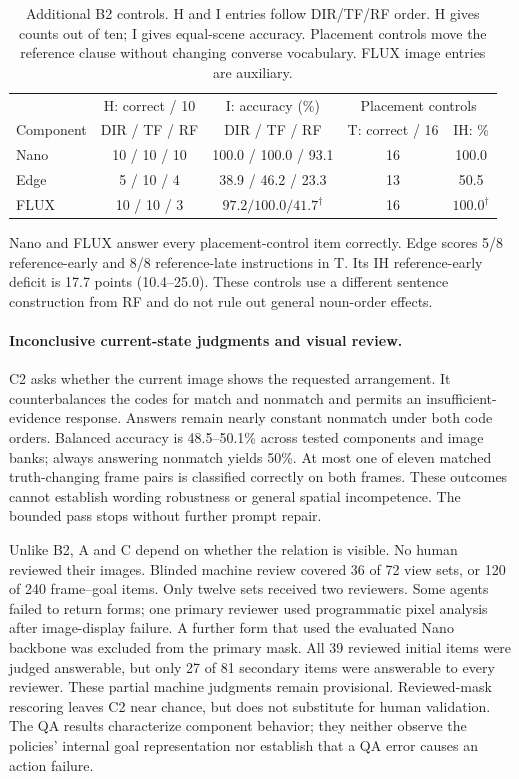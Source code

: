 \documentclass{article}
\begin{document}
\begin{table}[htbp]
\centering\small
\caption{Additional B2 controls. H and I entries follow DIR/TF/RF order. H gives counts out of ten; I gives equal-scene accuracy. Placement controls move the reference clause without changing converse vocabulary. FLUX image entries are auxiliary.}
\label{tab:vqa-controls}
\begin{tabular}{@{}lcccc@{}}
\toprule
& H: correct / 10 & I: accuracy (\%) & \multicolumn{2}{c}{Placement controls}\\
Component & DIR / TF / RF & DIR / TF / RF & T: correct / 16 & IH: \%\\
\midrule
Nano & 10 / 10 / 10 & 100.0 / 100.0 / 93.1 & 16 & 100.0\\
Edge & 5 / 10 / 4 & 38.9 / 46.2 / 23.3 & 13 & 50.5\\
FLUX & 10 / 10 / 3 & $97.2 / 100.0 / 41.7^\dagger$ & 16 & $100.0^\dagger$\\
\bottomrule
\end{tabular}
\end{table}

Nano and FLUX answer every placement-control item correctly. Edge scores 5/8 reference-early and 8/8 reference-late instructions in T. Its IH reference-early deficit is 17.7 points (10.4--25.0). These controls use a different sentence construction from RF and do not rule out general noun-order effects.

\paragraph{Inconclusive current-state judgments and visual review.}
C2 asks whether the current image shows the requested arrangement. It counterbalances the codes for match and nonmatch and permits an insufficient-evidence response. Answers remain nearly constant nonmatch under both code orders. Balanced accuracy is 48.5--50.1\% across tested components and image banks; always answering nonmatch yields 50\%. At most one of eleven matched truth-changing frame pairs is classified correctly on both frames. These outcomes cannot establish wording robustness or general spatial incompetence. The bounded pass stops without further prompt repair.

Unlike B2, A and C depend on whether the relation is visible. No human reviewed their images. Blinded machine review covered 36 of 72 view sets, or 120 of 240 frame--goal items. Only twelve sets received two reviewers. Some agents failed to return forms; one primary reviewer used programmatic pixel analysis after image-display failure. A further form that used the evaluated Nano backbone was excluded from the primary mask. All 39 reviewed initial items were judged answerable, but only 27 of 81 secondary items were answerable to every reviewer. These partial machine judgments remain provisional. Reviewed-mask rescoring leaves C2 near chance, but does not substitute for human validation. The QA results characterize component behavior; they neither observe the policies' internal goal representation nor establish that a QA error causes an action failure.
\end{document}
